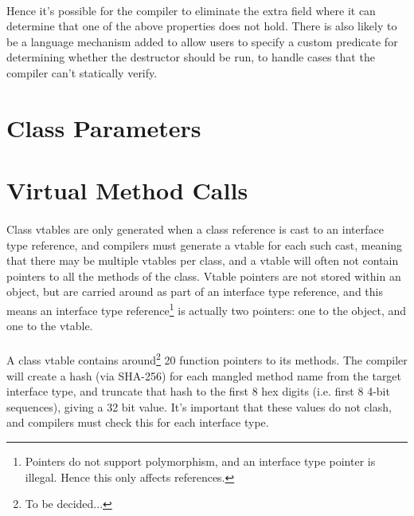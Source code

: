 \documentclass[12pt,twoside,notitlepage]{report}
\begin{document}
\paragraph{}
Hence it's possible for the compiler to eliminate the extra field where it can determine that one of the above properties does not hold. There is also likely to be a language mechanism added to allow users to specify a custom predicate for determining whether the destructor should be run, to handle cases that the compiler can't statically verify.

\section{Class Parameters}

\paragraph{}


\section{Virtual Method Calls}

\paragraph{}
Class vtables are only generated when a class reference is cast to an interface type reference, and compilers must generate a vtable for each such cast, meaning that there may be multiple vtables per class, and a vtable will often not contain pointers to all the methods of the class. Vtable pointers are not stored within an object, but are carried around as part of an interface type reference, and this means an interface type reference\footnote{Pointers do not support polymorphism, and an interface type pointer is illegal. Hence this only affects references.} is actually two pointers: one to the object, and one to the vtable.

\paragraph{}
A class vtable contains around\footnote{To be decided...} 20 function pointers to its methods. The compiler will create a hash (via SHA-256) for each mangled method name from the target interface type, and truncate that hash to the first 8 hex digits (i.e. first 8 4-bit sequences), giving a 32 bit value. It's important that these values do not clash, and compilers must check this for each interface type.
\end{document}
